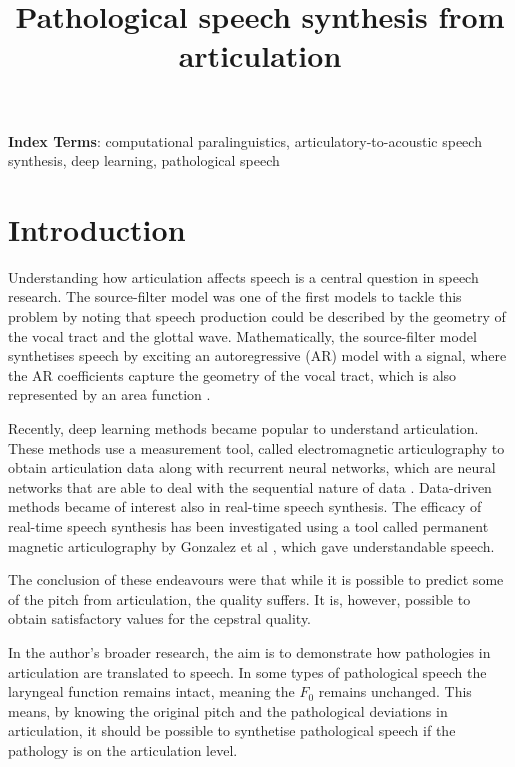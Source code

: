 \documentclass[a4paper]{article}
\title{Pathological speech synthesis from articulation}
\begin{document}
\maketitle
% 
\begin{abstract}
  \blindtext[1]
\end{abstract}
\noindent\textbf{Index Terms}: computational paralinguistics, articulatory-to-acoustic
speech synthesis, deep learning, pathological speech

\section{Introduction}

Understanding how articulation affects speech is a central question in speech
research. The source-filter model was one of the first models to tackle this
problem by noting that speech production could be described by
the geometry of the vocal tract and the glottal wave. Mathematically,
the source-filter model synthetises speech by exciting an autoregressive (AR) model with a
signal, where the AR coefficients capture the geometry of the
vocal tract, which is also represented by an area function \cite{Benesty2009}. 

Recently, deep learning methods became popular
to understand articulation. These methods use a measurement tool,
called electromagnetic articulography to obtain articulation data 
\cite{Aryal2016} \cite{Taguchi} \cite{Liu2018} along with recurrent
neural networks, which are neural networks that are able to deal with
the sequential nature of data \cite{Hochreiter1997}. Data-driven methods became of interest also
in real-time speech synthesis. The efficacy of real-time speech synthesis
has been investigated using a tool called permanent magnetic articulography
by Gonzalez et al \cite{Gonzalez2017}, which gave understandable
speech.

The conclusion of these endeavours were that while it is possible to
predict some of the pitch from articulation, the quality suffers.
It is, however, possible to obtain satisfactory values for the
cepstral quality.

In the author's broader research, the aim is to demonstrate how pathologies in
articulation are translated to speech. In some types of pathological
speech the laryngeal function remains intact, meaning the \( F_0 \)
remains unchanged. This means, by knowing the original pitch and the
pathological deviations in articulation, it should be possible to
synthetise pathological speech if the pathology is on the articulation level.
\end{document}

